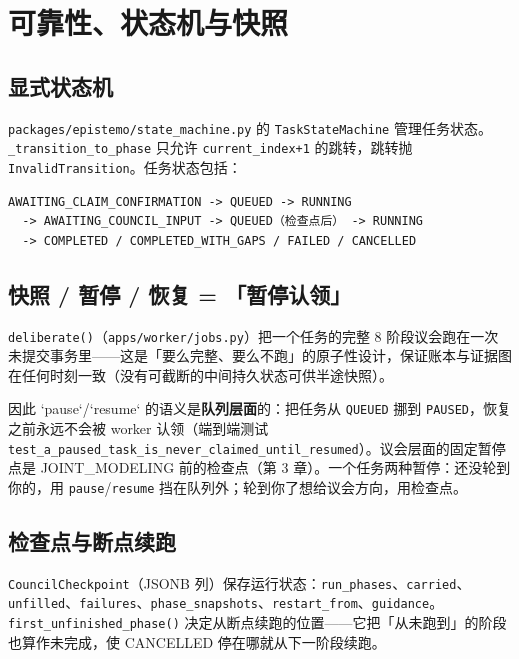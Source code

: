 \section{可靠性、状态机与快照}

\subsection{显式状态机}

\texttt{packages/epistemo/state\_machine.py} 的 \texttt{TaskStateMachine} 管理任务状态。\texttt{\_transition\_to\_phase} 只允许 \texttt{current\_index+1} 的跳转，跳转抛 \texttt{InvalidTransition}。任务状态包括：

\begin{lstlisting}
AWAITING_CLAIM_CONFIRMATION -> QUEUED -> RUNNING
  -> AWAITING_COUNCIL_INPUT -> QUEUED（检查点后） -> RUNNING
  -> COMPLETED / COMPLETED_WITH_GAPS / FAILED / CANCELLED
\end{lstlisting}

\subsection{快照 / 暂停 / 恢复 = 「暂停认领」}

\texttt{deliberate()}（\texttt{apps/worker/jobs.py}）把一个任务的完整 8 阶段议会跑在一次未提交事务里——这是「要么完整、要么不跑」的原子性设计，保证账本与证据图在任何时刻一致（没有可截断的中间持久状态可供半途快照）。

因此 `pause`/`resume` 的语义是\textbf{队列层面}的：把任务从 \texttt{QUEUED} 挪到 \texttt{PAUSED}，恢复之前永远不会被 worker 认领（端到端测试 \texttt{test\_a\_paused\_task\_is\_never\_claimed\_until\_resumed}）。议会层面的固定暂停点是 JOINT\_MODELING 前的检查点（第 3 章）。一个任务两种暂停：还没轮到你的，用 \texttt{pause}/\texttt{resume} 挡在队列外；轮到你了想给议会方向，用检查点。

\subsection{检查点与断点续跑}

\texttt{CouncilCheckpoint}（JSONB 列）保存运行状态：\texttt{run\_phases}、\texttt{carried}、\texttt{unfilled}、\texttt{failures}、\texttt{phase\_snapshots}、\texttt{restart\_from}、\texttt{guidance}。\texttt{first\_unfinished\_phase()} 决定从断点续跑的位置——它把「从未跑到」的阶段也算作未完成，使 CANCELLED 停在哪就从下一阶段续跑。

